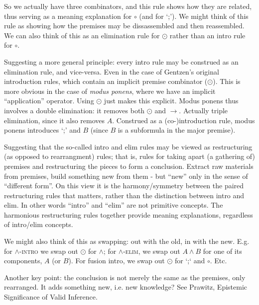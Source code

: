 \documentclass{article}
\begin{document}
So we actually have three combinators, and this rule shows how they
are related, thus serving as a meaning explanation for \(\circ\) (and
for `;').  We might think of this rule as showing how the premises may
be dissassembled and then reassembled.  We can also think of this as
an elimination rule for \(\odot\) rather than an intro rule for
\(\circ\).

\begin{remark}
  Suggesting a more general principle: every intro rule may be
  construed as an elimination rule, and vice-versa.  Even in the case
  of Gentzen's original introduction rules, which contain an implicit
  premise combinator (\(\odot\)).  This is more obvious in the case of
  \emph{modus ponens}, where we have an implicit ``application''
  operator.  Using \(\odot\) just makes this explicit.  Modus ponens
  thus involves a double elimination: it removes both \(\odot\) and
  \(\to\).  Actually triple elimination, since it also removes \(A\).
  Construed as a (co-)introduction rule, modus ponens introduces `;'
  and \(B\) (since \(B\) is a subformula in the major premise).
\end{remark}

\begin{remark}
  Suggesting that the so-called intro and elim rules may be viewed as
  restructuring (as opposed to rearrangment) rules; that is, rules for
  taking apart (a gathering of) premises and restructuring the pieces
  to form a conclusion.  Extract raw materials from premises, build
  something new from them - but ``new'' only in the sense of
  ``different form''.  On this view it is the harmony/symmetry between
  the paired restructuring rules that matters, rather than the
  distinction between intro and elim.  In other words ``intro'' and
  ``elim'' are not primitive concepts.  The harmonious restructuring
  rules together provide meaning explanations, regardless of
  intro/elim concepts.
\end{remark}

We might also think of this as swapping: out with the old, in with the
new.  E.g. for \(\land\)-\textsc{intro} we swap out \(\odot\) for
\(\land\); for \(\land\)-\textsc{elim}, we swap out \(A\land B\) for
one of its components, \(A\) (or \(B\)).  For fusion intro, we swap
out \(\odot\) for `;` and \(\circ\).  Etc.

Another key point: the conclusion is not merely the same as the
premises, only rearranged.  It adds something new, i.e. new knowledge?
See Prawitz, Epistemic Significance of Valid Inference.
\end{document}
